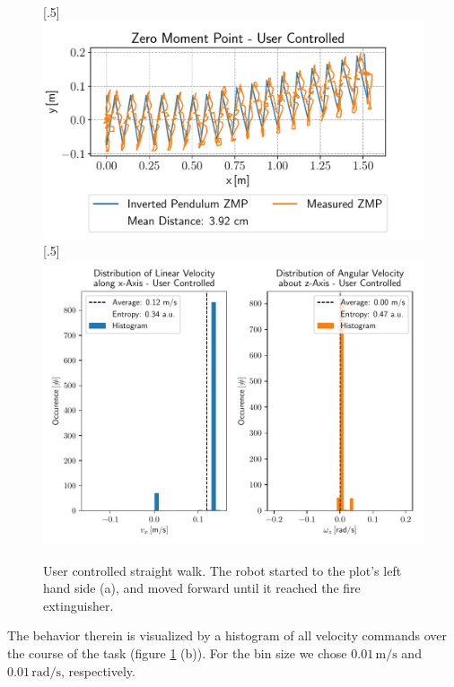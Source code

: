 \begin{figure}[h!]
	[.5\linewidth]{\includegraphics[scale=.45]{chapters/05_experiments/01_user_controlled_walking/02_test_environment/straight_walk_01_zmp.pdf}}
	[.5\linewidth]{\includegraphics[scale=.45]{chapters/05_experiments/01_user_controlled_walking/02_test_environment/straight_walk_01_entropy.pdf}}
	\caption{User controlled straight walk. The robot started to the plot's left hand side (a), and moved forward until it reached the fire extinguisher.}
	\label{fig::512_uc_straight}
\end{figure} 
The behavior therein is visualized by a histogram of all velocity commands over the course of the task (figure \ref{fig::512_uc_straight} (b)). For the bin size we chose $0.01\,\text{m}/\text{s}$ and $0.01\,\text{rad}/\text{s}$, respectively. 

